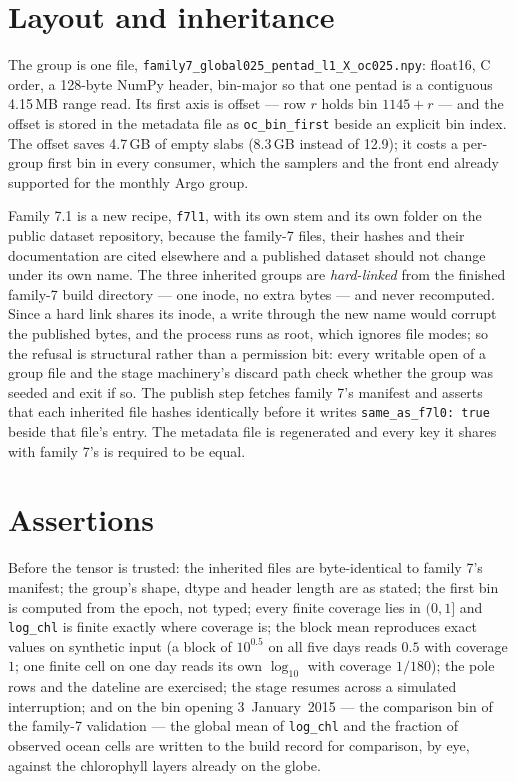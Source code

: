 \documentclass[10pt]{article}
\newcommand{\code}[1]{\texttt{#1}}
\begin{document}
\section{Layout and inheritance}

The group is one file, \code{family7\_global025\_pentad\_l1\_X\_oc025.npy}:
float16, C order, a 128-byte NumPy header, bin-major so that one pentad is a
contiguous 4.15\,MB range read. Its first axis is offset --- row $r$ holds
bin $1145 + r$ --- and the offset is stored in the metadata file as
\code{oc\_bin\_first} beside an explicit bin index. The offset saves 4.7\,GB
of empty slabs (8.3\,GB instead of 12.9); it costs a per-group first bin in
every consumer, which the samplers and the front end already supported for
the monthly Argo group.

Family 7.1 is a new recipe, \code{f7l1}, with its own stem and its own
folder on the public dataset repository, because the family-7 files, their
hashes and their documentation are cited elsewhere and a published dataset
should not change under its own name. The three inherited groups are
\emph{hard-linked} from the finished family-7 build directory --- one inode,
no extra bytes --- and never recomputed. Since a hard link shares its inode,
a write through the new name would corrupt the published bytes, and the
process runs as root, which ignores file modes; so the refusal is structural
rather than a permission bit: every writable open of a group file and the
stage machinery's discard path check whether the group was seeded and exit
if so. The publish step fetches family 7's manifest and asserts that each
inherited file hashes identically before it writes \code{same\_as\_f7l0:
true} beside that file's entry. The metadata file is regenerated and every
key it shares with family 7's is required to be equal.

\section{Assertions}

Before the tensor is trusted: the inherited files are byte-identical to
family 7's manifest; the group's shape, dtype and header length are as
stated; the first bin is computed from the epoch, not typed; every finite
coverage lies in $(0, 1]$ and \code{log\_chl} is finite exactly where
coverage is; the block mean reproduces exact values on synthetic input (a
block of $10^{0.5}$ on all five days reads $0.5$ with coverage $1$; one
finite cell on one day reads its own $\log_{10}$ with coverage $1/180$); the
pole rows and the dateline are exercised; the stage resumes across a
simulated interruption; and on the bin opening 3~January~2015 --- the
comparison bin of the family-7 validation --- the global mean of
\code{log\_chl} and the fraction of observed ocean cells are written to the
build record for comparison, by eye, against the chlorophyll layers already
on the globe.
\end{document}
